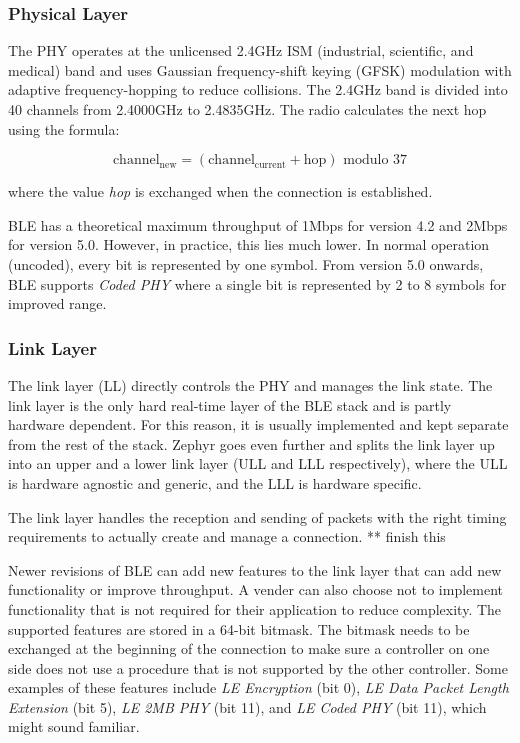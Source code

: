 \subsubsection{Physical Layer} The PHY operates at the unlicensed 2.4GHz ISM (industrial, scientific, and medical) band and uses Gaussian frequency-shift keying (GFSK) modulation with adaptive frequency-hopping to reduce collisions. The 2.4GHz band is divided into 40 channels from 2.4000GHz to 2.4835GHz. The radio calculates the next hop using the formula:

\[\text{channel}_{\text{new}} = (\text{channel}_{\text{current}} + \text{hop}) \text{ modulo } 37\]
    
where the value \textit{hop} is exchanged when the connection is established.

BLE has a theoretical maximum throughput of 1Mbps for version 4.2 and 2Mbps for version 5.0. However, in practice, this lies much lower. In normal operation (uncoded), every bit is represented by one symbol. From version 5.0 onwards, BLE supports \textit{Coded PHY} where a single bit is represented by 2 to 8 symbols for improved range.

\subsubsection{Link Layer} 
The link layer (LL) directly controls the PHY and manages the link state. The link layer is the only hard real-time layer of the BLE stack and is partly hardware dependent. For this reason, it is usually implemented and kept separate from the rest of the stack. Zephyr goes even further and splits the link layer up into an upper and a lower link layer (ULL and LLL respectively), where the ULL is hardware agnostic and generic, and the LLL is hardware specific.

The link layer handles the reception and sending of packets with the right timing requirements to actually create and manage a connection. 
** finish this 

Newer revisions of BLE can add new features to the link layer that can add new functionality or improve throughput. A vender can also choose not to implement functionality that is not required for their application to reduce complexity. The supported features are stored in a 64-bit bitmask. The bitmask needs to be exchanged at the beginning of the connection to make sure a controller on one side does not use a procedure that is not supported by the other controller. Some examples of these features include \textit{LE Encryption} (bit 0), \textit{LE Data Packet Length Extension} (bit 5), \textit{LE 2MB PHY} (bit 11), and \textit{LE Coded PHY} (bit 11), which might sound familiar\cite[p. 2827]{bluetooth_spec}.


